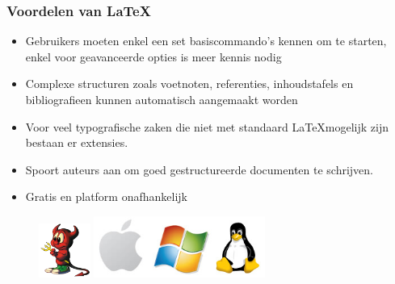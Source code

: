 \documentclass{beamer}
\begin{document}
\begin{frame}
\frametitle{Voordelen van \LaTeX}
\begin{itemize}
 \item Gebruikers moeten enkel een set basiscommando's kennen om te starten, enkel voor geavanceerde opties is meer kennis nodig
 \item Complexe structuren zoals voetnoten, referenties, inhoudstafels en bibliografieen kunnen automatisch aangemaakt worden
 \item Voor veel typografische zaken die niet met standaard \LaTeX mogelijk zijn bestaan er extensies.
 \item Spoort auteurs aan om goed gestructureerde documenten te schrijven.
 \item Gratis en platform onafhankelijk
\end{itemize}
\begin{figure}[h] 
  \includegraphics[width=0.15\textwidth]{images/bsd.png}
  \includegraphics[width=0.5\textwidth]{images/indep.jpg}
\end{figure}
\end{frame}

\end{document}
